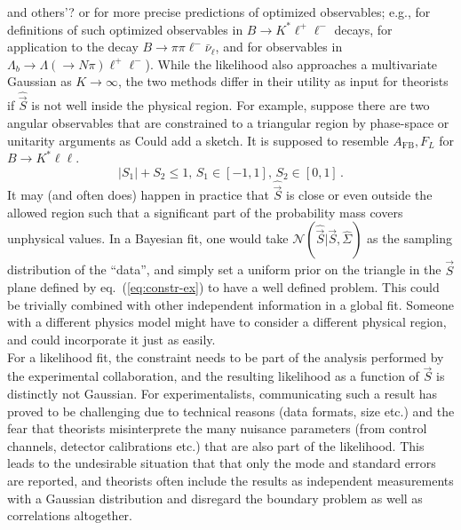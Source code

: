 \documentclass[aps,prd,reprint,nofootinbib,preprintnumbers]{revtex4}
\newcommand{\refeq}[1]{eq.~(\ref{eq:#1})}
\newcommand{\vecest}[1]{\widehat{\vec{#1}}}
\newcommand{\fred}[1]{{\color{brown!85!black}#1}}
\begin{document}
\begin{enumerate}
{    and others'?} or for more precise predictions of optimized
  observables; e.g.,
  \cite{Egede:2008uy,Egede:2010zc,Bobeth:2010wg,Becirevic:2011bp,
    Bobeth:2012vn,Matias:2012xw,DescotesGenon:2012zf} for definitions
  of such optimized observables in $B\to K^*\ell^+\ell^-$ decays,
  \cite{Faller:2013dwa} for application to the decay $B\to
  \pi\pi\ell^-\bar\nu_\ell$, and \cite{Boeer:2014xx} for observables
  in $\Lambda_b\to\Lambda(\to N\pi)\ell^+\ell^-$). While the
  likelihood also approaches a multivariate Gaussian as $K \to
  \infty$, the two methods differ in their utility as input for
  theorists if $\widehat{\vec{S}}$ is not well
  inside the physical region. For example, suppose there are two
  angular observables that are constrained to a triangular region by
  phase-space or unitarity arguments as \fred{Could add a sketch. It
    is supposed to resemble $A_{\text{FB}},F_L$ for $B \to K^* \ell
    \ell$.}
  \begin{equation}
    \label{eq:constr-ex}
    |S_1| + S_2 \le 1, \, S_1 \in [-1,1],\, S_2 \in [0,1] \,.
  \end{equation}
  It may (and often does) happen in practice that $\widehat{\vec{S}}$
  is close or even outside the allowed region such that a significant
  part of the probability mass covers unphysical values. In a Bayesian
  fit, one would take $\mathcal{N}(\vecest{S} | \vec{S},
  \widehat{\Sigma})$ as the sampling distribution of the ``data'', and
  simply set a uniform prior on the triangle in the $\vec{S}$ plane
  defined by \refeq{constr-ex} to have a well defined problem. This
  could be trivially combined with other independent information in a
  global fit. Someone with a different physics model might have to
  consider a
  different physical region, and could incorporate it just as easily.\\

  For a likelihood fit, the constraint needs to be part of the
  analysis performed by the experimental collaboration, and the
  resulting likelihood as a function of $\vec{S}$ is distinctly not
  Gaussian.  For experimentalists, communicating such a result has
  proved to be challenging due to technical reasons (data formats,
  size etc.) and the fear that theorists misinterprete the many
  nuisance parameters (from control channels, detector calibrations
  etc.) that are also part of the likelihood. This leads to the
  undesirable situation that that only the mode and standard errors
  are reported, and theorists often include the results as independent
  measurements with a Gaussian distribution and disregard the boundary
  problem as well as correlations altogether.

\end{enumerate}
\end{document}
